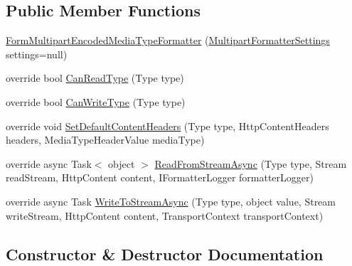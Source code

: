 \subsection*{Public Member Functions}
\begin{DoxyCompactItemize}
\item 
\hyperlink{classCqrs_1_1WebApi_1_1Formatters_1_1FormMultipart_1_1FormMultipartEncodedMediaTypeFormatter_a73f24dec1824edeaaa019bc0dfa1b2e2}{Form\+Multipart\+Encoded\+Media\+Type\+Formatter} (\hyperlink{classCqrs_1_1WebApi_1_1Formatters_1_1FormMultipart_1_1Infrastructure_1_1MultipartFormatterSettings}{Multipart\+Formatter\+Settings} settings=null)
\item 
override bool \hyperlink{classCqrs_1_1WebApi_1_1Formatters_1_1FormMultipart_1_1FormMultipartEncodedMediaTypeFormatter_a85006d7f413bbd7ceb2556b2ce68d402}{Can\+Read\+Type} (Type type)
\item 
override bool \hyperlink{classCqrs_1_1WebApi_1_1Formatters_1_1FormMultipart_1_1FormMultipartEncodedMediaTypeFormatter_a9fac23d803544c138f9e2fa75042a100}{Can\+Write\+Type} (Type type)
\item 
override void \hyperlink{classCqrs_1_1WebApi_1_1Formatters_1_1FormMultipart_1_1FormMultipartEncodedMediaTypeFormatter_a181d1b06501e0eda8667c6a4b844400b}{Set\+Default\+Content\+Headers} (Type type, Http\+Content\+Headers headers, Media\+Type\+Header\+Value media\+Type)
\item 
override async Task$<$ object $>$ \hyperlink{classCqrs_1_1WebApi_1_1Formatters_1_1FormMultipart_1_1FormMultipartEncodedMediaTypeFormatter_a4599833b528ecb762d9d5d2c72b11d90}{Read\+From\+Stream\+Async} (Type type, Stream read\+Stream, Http\+Content content, I\+Formatter\+Logger formatter\+Logger)
\item 
override async Task \hyperlink{classCqrs_1_1WebApi_1_1Formatters_1_1FormMultipart_1_1FormMultipartEncodedMediaTypeFormatter_aced660e9ab818558fc5728ec82e2434e}{Write\+To\+Stream\+Async} (Type type, object value, Stream write\+Stream, Http\+Content content, Transport\+Context transport\+Context)
\end{DoxyCompactItemize}


\subsection{Constructor \& Destructor Documentation}
\mbox{\label{classCqrs_1_1WebApi_1_1Formatters_1_1FormMultipart_1_1FormMultipartEncodedMediaTypeFormatter_a73f24dec1824edeaaa019bc0dfa1b2e2}} 
